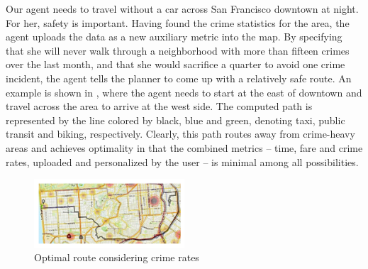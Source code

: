 Our agent needs to travel without a car across San Francisco downtown at night.
For her, safety is important.
Having found the crime statistics for the area, the agent uploads
the data as a new auxiliary metric into the map.
By specifying that she will never walk through a neighborhood
with more than fifteen crimes over the last month, and that
she would sacrifice a quarter to avoid one crime incident,
the agent tells the planner to come up with a relatively safe
route. An example is shown in , where the agent
needs to start at the east of downtown and travel across the area
to arrive at the west side.  
The computed path is represented by the line colored by black,
blue and green, denoting taxi, public transit and biking, respectively.
Clearly, this path routes away from crime-heavy areas and achieves
optimality in that the combined metrics -- time, fare and crime rates,
uploaded and personalized by the user -- is minimal among all possibilities.

\begin{figure}[!ht]
  \centering
    \includegraphics[width=0.5\textwidth]{figs/crime.pdf}
  \caption{Optimal route considering crime rates\label{fig:crime}}
\end{figure}
